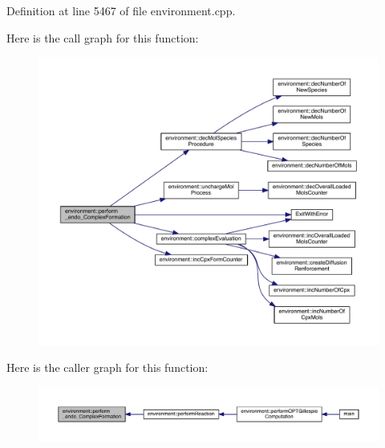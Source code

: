 Definition at line 5467 of file environment.\-cpp.



Here is the call graph for this function\-:\nopagebreak
\begin{figure}[H]
\begin{center}
\leavevmode
\includegraphics[width=350pt]{a00014_ae942db2453c56b60250a5d43452b91a5_cgraph}
\end{center}
\end{figure}




Here is the caller graph for this function\-:\nopagebreak
\begin{figure}[H]
\begin{center}
\leavevmode
\includegraphics[width=350pt]{a00014_ae942db2453c56b60250a5d43452b91a5_icgraph}
\end{center}
\end{figure}


